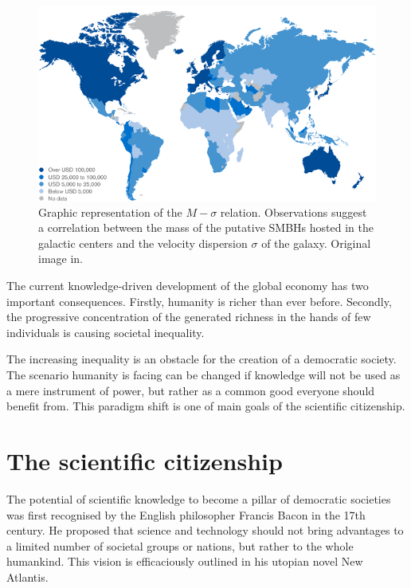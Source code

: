 \begin{figure}[!t] 
 \begin{center}
 \includegraphics[scale=0.3]{Images/World_wealth_levels.png}
 \caption{Graphic representation of the $M - \sigma$ relation. Observations suggest a correlation between the mass of the putative SMBHs hosted in the galactic centers and the velocity dispersion $\sigma$ of the galaxy. Original image in.}
 \label{M_sigma_relation}
 \end{center}
\end{figure}

The current knowledge-driven development of the global economy has two important consequences. Firstly, humanity is richer than ever before. Secondly, the progressive concentration of the generated richness in the hands of few individuals is causing societal inequality. 

The increasing inequality is an obstacle for the creation of a democratic society. The scenario humanity is facing can be changed if knowledge will not be used as a mere instrument of power, but rather as a common good everyone should benefit from. This paradigm shift is one of main goals of the scientific citizenship.

\section{The scientific citizenship} \label{The_scientific_citizenship}
The potential of scientific knowledge to become a pillar of democratic societies was first recognised by the English philosopher Francis Bacon in the 17th century. He proposed that science and technology should not bring advantages to a limited number of societal groups or nations, but rather to the whole humankind. This vision is efficaciously outlined in his utopian novel New Atlantis.

